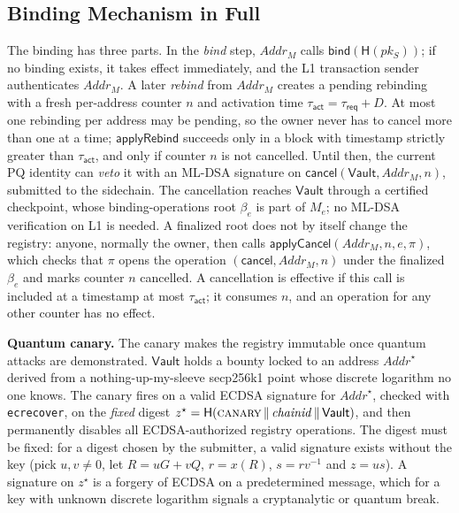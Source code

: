 \documentclass[10pt,journal,compsoc]{IEEEtran}
\theoremstyle{tplain}
\theoremstyle{tdef}
\theoremstyle{remark}
\newcommand{\Vault}{\mathsf{Vault}}
\newcommand{\Hash}{\mathsf{H}}
\begin{document}
\subsection{Binding Mechanism in Full}\label{S-binding}
The binding has three parts. In the \emph{bind} step, $\mathit{Addr}_M$ calls $\mathsf{bind}(\Hash(pk_S))$; if no binding exists, it takes effect immediately, and the L1 transaction sender authenticates $\mathit{Addr}_M$. A later \emph{rebind} from $\mathit{Addr}_M$ creates a pending rebinding with a fresh per-address counter $n$ and activation time $\tau_{\mathsf{act}}=\tau_{\mathsf{req}}+D$. At most one rebinding per address may be pending, so the owner never has to cancel more than one at a time; $\mathsf{applyRebind}$ succeeds only in a block with timestamp strictly greater than $\tau_{\mathsf{act}}$, and only if counter $n$ is not cancelled. Until then, the current PQ identity can \emph{veto} it with an ML-DSA signature on $\textsf{cancel}(\Vault,\mathit{Addr}_M,n)$, submitted to the sidechain. The cancellation reaches $\Vault$ through a certified checkpoint, whose binding-operations root $\beta_e$ is part of $M_e$; no ML-DSA verification on L1 is needed. A finalized root does not by itself change the registry: anyone, normally the owner, then calls $\mathsf{applyCancel}(\mathit{Addr}_M,n,e,\pi)$, which checks that $\pi$ opens the operation $(\textsf{cancel},\mathit{Addr}_M,n)$ under the finalized $\beta_e$ and marks counter $n$ cancelled. A cancellation is effective if this call is included at a timestamp at most $\tau_{\mathsf{act}}$; it consumes $n$, and an operation for any other counter has no effect.

\noindent\textbf{Quantum canary.} The canary makes the registry immutable once quantum attacks are demonstrated. $\Vault$ holds a bounty locked to an address $\mathit{Addr}^\star$ derived from a nothing-up-my-sleeve secp256k1 point whose discrete logarithm no one knows. The canary fires on a valid ECDSA signature for $\mathit{Addr}^\star$, checked with \texttt{ecrecover}, on the \emph{fixed} digest $z^\star=\Hash(\textsc{canary}\,\|\,\mathit{chainid}\,\|\,\Vault)$, and then permanently disables all ECDSA-authorized registry operations. The digest must be fixed: for a digest chosen by the submitter, a valid signature exists without the key (pick $u,v\ne0$, let $R=uG+vQ$, $r=x(R)$, $s=rv^{-1}$ and $z=us$). A signature on $z^\star$ is a forgery of ECDSA on a predetermined message, which for a key with unknown discrete logarithm signals a cryptanalytic or quantum break.
\end{document}
